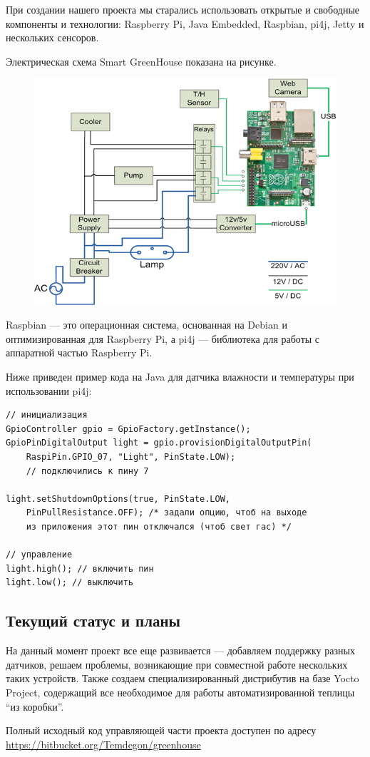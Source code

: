 \documentclass[10pt, a5paper]{article}
\begin{document}
При создании нашего проекта мы старались использовать открытые и свободные компоненты и технологии: Raspberry Pi, Java Embedded, Raspbian, pi4j, Jetty и нескольких сенсоров.

Электрическая схема Smart GreenHouse показана на рисунке.

\begin{figure}[h!]
  \centering
  \includegraphics[scale=0.8]{13_2014_1.png}
\end{figure}

Raspbian --- это операционная система, основанная на Debian и оптимизированная для Raspberry Pi, а pi4j --- библиотека для работы с аппаратной частью Raspberry Pi.

Ниже приведен пример кода на Java для датчика влажности и температуры при использовании pi4j:

\begin{verbatim}
// инициализация
GpioController gpio = GpioFactory.getInstance();
GpioPinDigitalOutput light = gpio.provisionDigitalOutputPin(
	RaspiPin.GPIO_07, "Light", PinState.LOW); 
	// подключились к пину 7
	
light.setShutdownOptions(true, PinState.LOW, 
	PinPullResistance.OFF); /* задали опцию, чтоб на выходе 
	из приложения этот пин отключался (чтоб свет гас) */

// управление
light.high(); // включить пин
light.low(); // выключить
\end{verbatim}
\subsection*{Текущий статус и планы}

На данный момент проект все еще развивается --- добавляем поддержку разных датчиков, решаем проблемы, возникающие при совместной работе нескольких таких устройств. 
Также создаем специализированный дистрибутив на базе Yocto Project, содержащий все необходимое для работы автоматизированной теплицы ``из коробки''.

Полный исходный код управляющей части проекта доступен по адресу \url{https://bitbucket.org/Temdegon/greenhouse}
\end{document}
